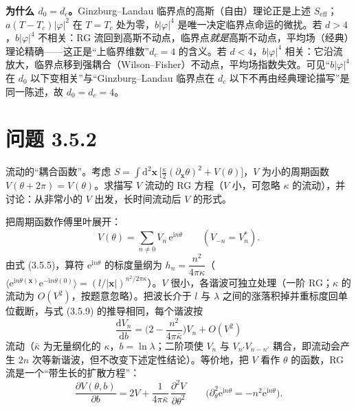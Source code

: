 \textbf{为什么 $d_0=d_c$。}Ginzburg--Landau 临界点的高斯（自由）理论正是上述 $S_{\mathrm{eff}}$；$a(T-T_c)|\varphi|^{2}$ 在 $T=T_c$ 处为零，$b|\varphi|^{4}$ 是唯一决定临界点命运的微扰。若 $d>4$，$b|\varphi|^{4}$ 不相关：RG 流回到高斯不动点，临界点\emph{就是}高斯不动点，平均场（经典）理论精确——这正是“上临界维数”$d_c=4$ 的含义。若 $d<4$，$b|\varphi|^{4}$ 相关：它沿流放大，临界点移到强耦合（Wilson--Fisher）不动点，平均场指数失效。可见“$b|\varphi|^{4}$ 在 $d_0$ 以下变相关”与“Ginzburg--Landau 临界点在 $d_c$ 以下不再由经典理论描写”是同一陈述，故 $d_0=d_c=4$。

\section*{问题 3.5.2}
\begin{problem}
流动的“耦合函数”。考虑 $S=\int\mathrm{d}^{2}\pmb{x}\,\big[\frac{\kappa}{2}(\partial_{\pmb{x}}\theta)^{2}+V(\theta)\big]$，$V$ 为小的周期函数 $V(\theta+2\pi)=V(\theta)$。求描写 $V$ 流动的 RG 方程（$V$ 小，可忽略 $\kappa$ 的流动），并讨论：从非常小的 $V$ 出发，长时间流动后 $V$ 的形式。
\end{problem}
\solution

把周期函数作傅里叶展开：
\begin{equation*}
V(\theta)=\sum_{n\neq0}V_n\,\mathrm{e}^{\mathrm{i}n\theta}\qquad(V_{-n}=V_n^{*}) .
\end{equation*}
由式 (3.5.5)，算符 $\mathrm{e}^{\mathrm{i}n\theta}$ 的标度量纲为 $h_n=\dfrac{n^{2}}{4\pi\kappa}$（$\langle\mathrm{e}^{\mathrm{i}n\theta(\pmb{x})}\mathrm{e}^{-\mathrm{i}n\theta(0)}\rangle=(l/|\pmb{x}|)^{n^{2}/2\pi\kappa}$）。$V$ 很小，各谐波可独立处理（一阶 RG；$\kappa$ 的流动为 $O(V^{2})$，按题意忽略）。把波长介于 $l$ 与 $\lambda$ 之间的涨落积掉并重标度回单位截断，与式 (3.5.9) 的推导相同，每个谐波按
\begin{equation*}
\boxed{\;\frac{\mathrm{d}V_n}{\mathrm{d}b}
=\Big(2-\frac{n^{2}}{4\pi\bar\kappa}\Big)V_n+O(V^{2})\;}
\end{equation*}
流动（$\bar\kappa$ 为无量纲化的 $\kappa$，$b=\ln\lambda$；二阶项使 $V_{n}$ 与 $V_{n'}V_{n-n'}$ 耦合，即流动会产生 $2n$ 次等新谐波，但不改变下述定性结论）。等价地，把 $V$ 看作 $\theta$ 的函数，RG 流是一个“带生长的扩散方程”：
\begin{equation*}
\frac{\partial V(\theta,b)}{\partial b}=2V+\frac{1}{4\pi\bar\kappa}\,\frac{\partial^{2}V}{\partial\theta^{2}}
\qquad\big(\partial_\theta^{2}\mathrm{e}^{\mathrm{i}n\theta}=-n^{2}\mathrm{e}^{\mathrm{i}n\theta}\big) .
\end{equation*}

